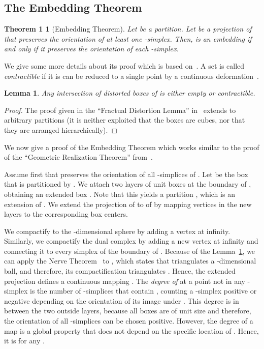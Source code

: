 \documentclass[12pt]{article}
\newtheorem*{embtheorem}{Theorem 1}
\newtheorem{lemma}[theorem]{Lemma}
\begin{document}
\begin{appendix}


\section{The Embedding Theorem}
\label{app:embedding}


\begin{embtheorem}[Embedding Theorem]
Let  be a partition.
Let  be a projection of  that preserves
the orientation of at least one -simplex.
Then,  is an embedding if and only if 
it preserves the orientation of each -simplex.
\end{embtheorem}

We give some more details about its proof which is based on~\cite{ek-freudenthal}.
A set is called \emph{contractible} if it is can be reduced to a single point
by a continuous deformation~\cite{hatcher}.

\begin{lemma}\label{lem:fractual_distortion}
Any intersection of  distorted boxes of  is either empty or contractible.
\end{lemma}
\begin{proof}
The proof given in the ``Fractual Distortion Lemma'' in~\cite{ek-freudenthal}
extends to arbitrary partitions (it is neither exploited that the boxes are cubes, nor
that they are arranged hierarchically).
\end{proof}

We now give a proof of the Embedding Theorem which works similar to
the proof of the ``Geometric Realization Theorem'' from~\cite{ek-freudenthal}.

Assume first that  preserves the orientation of all -simplices of .
Let  be the box that is partitioned by . 
We attach two layers of unit boxes at the boundary of , obtaining an extended box .
Note that this yields a partition , which is an extension of .
We extend the projection  of  to  of  
by mapping vertices in the new layers to the corresponding box centers.

We compactify  to the -dimensional sphere  by adding a vertex at infinity.
Similarly, we compactify the dual complex  by adding a new vertex at infinity
and connecting it to every simplex of the boundary of .
Because of the Lemma~\ref{lem:fractual_distortion}, 
we can apply the Nerve Theorem~\cite{eh-computational} to , which states
that  triangulates a -dimensional ball, and therefore, its compactification
triangulates .
Hence, the extended projection  defines a continuous mapping .
The \emph{degree of } at a point  not in any -simplex is the number of
-simplices that contain , counting a -simplex positive or negative
depending on the orientation of its image under . This degree is  in between the two
outside layers, because all boxes are of unit size and therefore, the orientation
of all -simplices can be chosen positive. However, the degree of a map is a global
property that does not depend on the specific location of . Hence, it is  for any .
 

\end{appendix}
\end{document}
